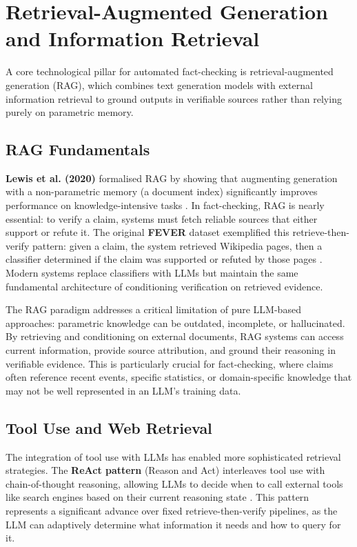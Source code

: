 \documentclass[12pt,a4paper]{article}
\begin{document}
\section{Retrieval-Augmented Generation and Information Retrieval}

A core technological pillar for automated fact-checking is retrieval-augmented generation (RAG), which combines text generation models with external information retrieval to ground outputs in verifiable sources rather than relying purely on parametric memory.

\subsection{RAG Fundamentals}

\textbf{Lewis et al. (2020)} formalised RAG by showing that augmenting generation with a non-parametric memory (a document index) significantly improves performance on knowledge-intensive tasks \citep{lewis2020retrieval}. In fact-checking, RAG is nearly essential: to verify a claim, systems must fetch reliable sources that either support or refute it. The original \textbf{FEVER} dataset exemplified this retrieve-then-verify pattern: given a claim, the system retrieved Wikipedia pages, then a classifier determined if the claim was supported or refuted by those pages \citep{thorne2018fever}. Modern systems replace classifiers with LLMs but maintain the same fundamental architecture of conditioning verification on retrieved evidence.

The RAG paradigm addresses a critical limitation of pure LLM-based approaches: parametric knowledge can be outdated, incomplete, or hallucinated. By retrieving and conditioning on external documents, RAG systems can access current information, provide source attribution, and ground their reasoning in verifiable evidence. This is particularly crucial for fact-checking, where claims often reference recent events, specific statistics, or domain-specific knowledge that may not be well represented in an LLM's training data.

\subsection{Tool Use and Web Retrieval}

The integration of tool use with LLMs has enabled more sophisticated retrieval strategies. The \textbf{ReAct pattern} (Reason and Act) interleaves tool use with chain-of-thought reasoning, allowing LLMs to decide when to call external tools like search engines based on their current reasoning state \citep{yao2023react}. This pattern represents a significant advance over fixed retrieve-then-verify pipelines, as the LLM can adaptively determine what information it needs and how to query for it.
\end{document}
